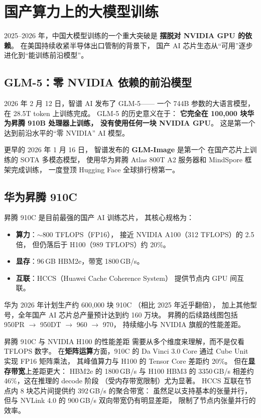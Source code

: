 \section{国产算力上的大模型训练}
\label{sec:domestic-training}

2025--2026 年，中国大模型训练的一个重大突破是
\textbf{摆脱对 NVIDIA GPU 的依赖}。
在美国持续收紧半导体出口管制的背景下，
国产 AI 芯片生态从“可用”逐步进化到“能训练前沿模型”。

\subsection{GLM-5：零 NVIDIA 依赖的前沿模型}

2026 年 2 月 12 日，智谱 AI 发布了 GLM-5——%
一个 744B 参数的大语言模型，
在 28.5T token 上训练完成。
GLM-5 的历史意义在于：
\textbf{它完全在 100,000 块华为昇腾 910B 处理器上训练，
没有使用任何一块 NVIDIA GPU}。
这是第一个达到前沿水平的“零 NVIDIA” AI 模型。

更早的 2026 年 1 月 16 日，
智谱发布的 \textbf{GLM-Image} 是第一个%
在国产芯片上训练的 SOTA 多模态模型，
使用华为昇腾 Atlas 800T A2 服务器和 MindSpore 框架完成训练，
一度登顶 Hugging Face 全球排行榜第一。

\subsection{华为昇腾 910C}

昇腾 910C 是目前最强的国产 AI 训练芯片，
其核心规格为：
\begin{itemize}[noitemsep]
  \item \textbf{算力}：$\sim$800 TFLOPS（FP16），
        接近 NVIDIA A100（312 TFLOPS）的 2.5 倍，
        但仍落后于 H100（989 TFLOPS）约 20\%。
  \item \textbf{显存}：96\,GB HBM2e，带宽 1800\,GB/s。
  \item \textbf{互联}：HCCS（Huawei Cache Coherence System）
        提供节点内 GPU 间互联。
\end{itemize}

华为 2026 年计划生产约 600,000 块 910C
（相比 2025 年近乎翻倍），
加上其他型号，全年国产 AI 芯片总产量预计达到约 160 万块。
昇腾的后续路线图包括 950PR $\to$ 950DT $\to$ 960 $\to$ 970，
持续缩小与 NVIDIA 旗舰的性能差距。

昇腾 910C 与 NVIDIA H100 的性能差距
需要从多个维度来理解，而不是仅看 TFLOPS 数字。
在\textbf{矩阵运算}方面，910C 的 Da Vinci 3.0 Core
通过 Cube Unit 实现 FP16 矩阵乘法，
其峰值算力与 H100 的 Tensor Core 差距约 20\%。
但在\textbf{显存带宽}上差距更大：
HBM2e 的 1800\,GB/s 与 H100 HBM3 的 3350\,GB/s
相差约 46\%，这在推理的 decode 阶段
（受内存带宽限制）尤为显著。
HCCS 互联在节点内 8 块芯片间提供约 392\,GB/s 的聚合带宽：
虽然足以支持基本的张量并行，
但与 NVLink 4.0 的 900\,GB/s 双向带宽仍有明显差距，
限制了节点内张量并行的效率。

